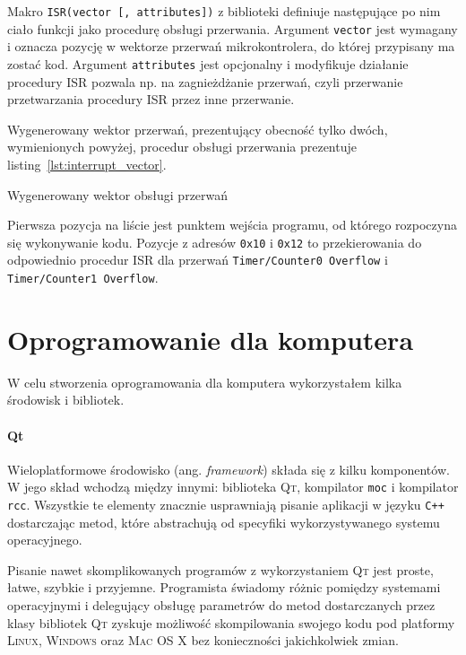 Makro \texttt{ISR(vector [, attributes])} z biblioteki  definiuje następujące po nim ciało funkcji jako procedurę obsługi przerwania. Argument \texttt{vector} jest wymagany i oznacza pozycję w wektorze przerwań mikrokontrolera, do której przypisany ma zostać kod. Argument \texttt{attributes} jest opcjonalny i modyfikuje działanie procedury ISR \ppauza pozwala np. na zagnieżdżanie przerwań, czyli przerwanie przetwarzania procedury ISR przez inne przerwanie.

Wygenerowany wektor przerwań, prezentujący obecność tylko dwóch, wymienionych powyżej, procedur obsługi przerwania prezentuje listing~\ref{lst:interrupt_vector}.

\begin{listing}
  
  \caption[Wektor obsługi przerwań]{Wygenerowany wektor obsługi przerwań}
  \label{lst:interrupt_vector}
\end{listing}

Pierwsza pozycja na liście jest punktem wejścia programu, od którego rozpoczyna się wykonywanie kodu. Pozycje z adresów \texttt{0x10} i \texttt{0x12} to przekierowania do odpowiednio procedur ISR dla przerwań \texttt{Timer/Counter0 Overflow} i \texttt{Timer/Counter1 Overflow}.

\section{Oprogramowanie dla komputera}
W celu stworzenia oprogramowania dla komputera wykorzystałem kilka środowisk i bibliotek.

\paragraph{Qt}
Wieloplatformowe środowisko (ang. \textsl{framework})  składa się z kilku komponentów. W jego skład wchodzą między innymi: biblioteka \textsc{Qt}, kompilator \verb|moc| i kompilator \verb|rcc|. Wszystkie te elementy znacznie usprawniają pisanie aplikacji w języku \verb|C++| dostarczając metod, które abstrachują od specyfiki wykorzystywanego systemu operacyjnego.

Pisanie nawet skomplikowanych programów z wykorzystaniem \textsc{Qt} jest proste, łatwe, szybkie i przyjemne. Programista świadomy różnic pomiędzy systemami operacyjnymi i delegujący obsługę parametrów do metod dostarczanych przez klasy bibliotek \textsc{Qt} zyskuje możliwość skompilowania swojego kodu pod platformy \textsc{Linux}, \textsc{Windows} oraz \textsc{Mac OS X} bez konieczności jakichkolwiek zmian.


